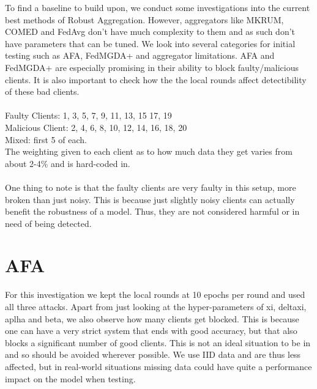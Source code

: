 To find a baseline to build upon, we conduct some investigations into the current best methods of Robust Aggregation.
However, aggregators like MKRUM, COMED and FedAvg don't have much complexity to them and as such don't have parameters that can be tuned.
We look into several categories for initial testing such as AFA, FedMGDA+ and aggregator limitations. 
AFA and FedMGDA+ are especially promising in their ability to block faulty/malicious clients. 
It is also important to check how the the local rounds affect detectibility of these bad clients.
\\ \\
Faulty Clients: 1, 3, 5, 7, 9, 11, 13, 15 17, 19
\\
Malicious Client: 2, 4, 6, 8, 10, 12, 14, 16, 18, 20
\\
Mixed: first 5 of each.
\\
The weighting given to each client as to how much data they get varies from about 2-4\% and is hard-coded in.
\\ \\
One thing to note is that the faulty clients are very faulty in this setup, more broken than just noisy.
This is because just slightly noisy clients can actually benefit the robustness of a model. 
Thus, they are not considered harmful or in need of being detected.

\section{AFA}
For this investigation we kept the local rounds at 10 epochs per round and used all three attacks.
Apart from just looking at the hyper-parameters of xi, deltaxi, aplha and beta, we also observe how many clients get blocked.
This is because one can have a very strict system that ends with good accuracy, but that also blocks a significant number of good clients.
This is not an ideal situation to be in and so should be avoided wherever possible.
We use IID data and are thus less affected, but in real-world situations missing data could have quite a performance impact on the model when testing.

